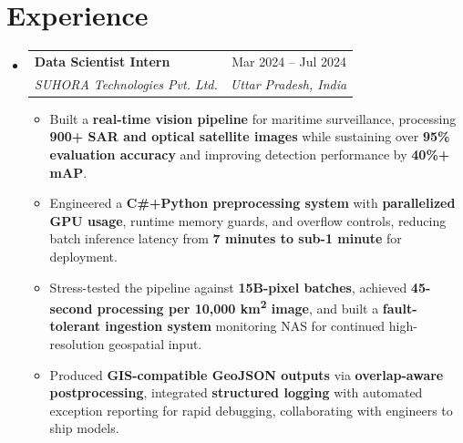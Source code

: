 \documentclass[letterpaper,11pt]{article}
\makeatletter
\newcommand{\resumeItem}[1]{
  \item\small{
    {#1 \vspace{-2pt}}
  }
}
\newcommand{\resumeSubheading}[4]{
  \vspace{-2pt}\item
    \begin{tabular*}{0.97\textwidth}[t]{l@{\extracolsep{\fill}}r}
      \textbf{#1} & #2 \\
      \textit{\small#3} & \textit{\small #4} \\
    \end{tabular*}\vspace{-7pt}
}
\newcommand{\resumeSubHeadingListStart}{\begin{itemize}[leftmargin=0.15in, label={}]}
\newcommand{\resumeSubHeadingListEnd}{\end{itemize}}
\newcommand{\resumeItemListStart}{\begin{itemize}}
\newcommand{\resumeItemListEnd}{\end{itemize}\vspace{-5pt}}
\makeatother
\begin{document}
\vspace{-10pt}
\section{\textbf{Experience}}
  \resumeSubHeadingListStart
    \resumeSubheading
      {Data Scientist Intern}{Mar 2024 -- Jul 2024}
      {SUHORA Technologies Pvt. Ltd.}{Uttar Pradesh, India}
      \resumeItemListStart
        \resumeItem{Built a \textbf{real-time vision pipeline} for maritime surveillance, processing \textbf{900+ SAR and optical satellite images} while sustaining over \textbf{95\% evaluation accuracy} and improving detection performance by \textbf{40\%+ mAP}.}
        \resumeItem{Engineered a \textbf{C\#+Python preprocessing system} with \textbf{parallelized GPU usage}, runtime memory guards, and overflow controls, reducing batch inference latency from \textbf{7 minutes to sub-1 minute} for deployment.}
        \resumeItem{Stress-tested the pipeline against \textbf{15B-pixel batches}, achieved \textbf{45-second processing per 10,000 km\textsuperscript{2} image}, and built a \textbf{fault-tolerant ingestion system} monitoring NAS for continued high-resolution geospatial input.}
        \resumeItem{Produced \textbf{GIS-compatible GeoJSON outputs} via \textbf{overlap-aware postprocessing}, integrated \textbf{structured logging} with automated exception reporting for rapid debugging, collaborating with engineers to ship models.}
      \resumeItemListEnd
  \resumeSubHeadingListEnd
\vspace{-3pt}
\end{document}
